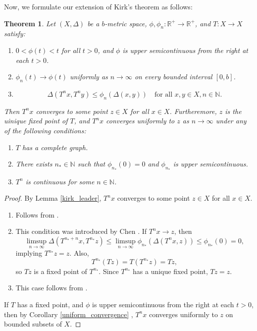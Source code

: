 \documentclass{birkjour}
\newtheorem{thm}{Theorem}[section]
\theoremstyle{definition}
\theoremstyle{remark}
\numberwithin{equation}{section}
\begin{document}
Now, we formulate our extension of Kirk's theorem as follows:
\begin{thm}
Let \((X,\Delta)\) be a \(b\)-metric space, \(\phi, \phi_n : \mathbb{R}^+ \to \mathbb{R}^+\), and \(T: X \to X\) satisfy:
\begin{enumerate}
    \item \(0 < \phi(t) < t\) for all \(t > 0\), and \(\phi\) is upper semicontinuous from the right at each \(t > 0\).
    \item \(\phi_n(t) \to \phi(t)\) uniformly as \(n \to \infty\) on every bounded interval \([0,b]\).
    \item
    \[
    \Delta(T^{n}x, T^{n}y) \leq \phi_n(\Delta(x,y)) \quad \text{for all } x,y \in X, n \in \mathbb{N}.
    \]
\end{enumerate}
Then \(T^{n} x \) converges to some point $z\in X$ for all \(x \in X\). Furtheremore,  $z$ is the uinique fixed point of $T$, and $T^{n}x$ converges uniformly to $z$ as $n\to\infty$ under any of the following conditions: 
\begin{enumerate}
    \item \(T\) has a complete graph.
    \item There exists \(n_* \in \mathbb{N}\) such that \(\phi_{n_*}(0) = 0\) and \(\phi_{n_*}\) is upper semicontinuous.
    \item \(T^{n}\) is continuous for some \(n \in \mathbb{N}\).
\end{enumerate}
\end{thm}
\begin{proof}
By Lemma \ref{kirk_leader}, $T^{n}x$ converges to some point $z\in X$ for all $x\in X$.
\begin{enumerate}
    \item Follows from \cite[Corollary 4]{leader1983equivalent}.

    \item This condition was introduced by Chen \cite[Theorem 2.2]{chen2005asymptotic}. If \(T^{n} x \to z\), then
    \[
    \limsup_{n \to \infty} \Delta(T^{n_* + n} x, T^{n_*} z) \leq \limsup_{n \to \infty} \phi_{n_*}(\Delta(T^{n} x, z)) \leq \phi_{n_*}(0) = 0,
    \]
    implying \(T^{n_*} z = z\). Also,
    \[
    T^{n_*} (T z) = T (T^{n_*} z) = T z,
    \]
    so \(T z\) is a fixed point of \(T^{n_*}\). Since \(T^{n_*}\) has a unique fixed point, \(T z = z\).

    \item This case follows from \cite[Theorem 3.1]{reich2008}.
\end{enumerate}
If $T$ has a fixed point, and $\phi$ is upper semicontinuous from the right at each $t>0$, then by Corollary \ref{uniform_convergence} , $T^{n}x$ converges uniformly to $z$ on bounded subsets of $X$.
\end{proof}
\end{document}

